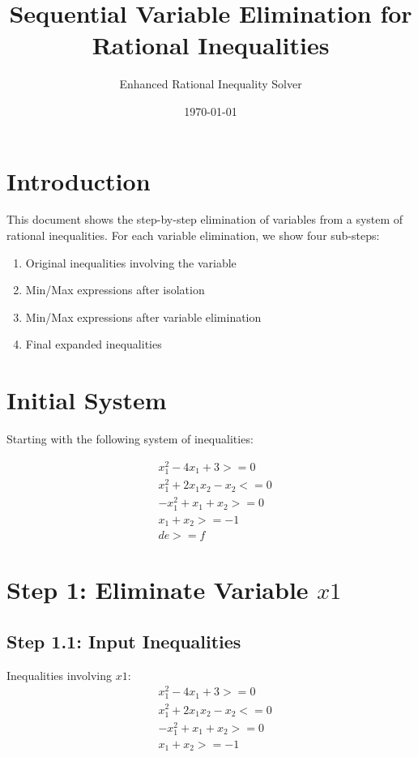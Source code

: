 \documentclass{article}
\title{Sequential Variable Elimination for Rational Inequalities}
\author{Enhanced Rational Inequality Solver}
\date{\today}
\begin{document}
\maketitle

\section{Introduction}

This document shows the step-by-step elimination of variables from a system of rational inequalities. 
For each variable elimination, we show four sub-steps:
\begin{enumerate}
\item Original inequalities involving the variable
\item Min/Max expressions after isolation
\item Min/Max expressions after variable elimination
\item Final expanded inequalities
\end{enumerate}

\section{Initial System}

Starting with the following system of inequalities:

\begin{align}
& x_{1}^{2} - 4 x_{1} + 3 >= 0 \\
& x_{1}^{2} + 2 x_{1} x_{2} - x_{2} <= 0 \\
& - x_{1}^{2} + x_{1} + x_{2} >= 0 \\
& x_{1} + x_{2} >= -1 \\
& d e >= f
\end{align}

\section{Step 1: Eliminate Variable $x1$}

\subsection{Step 1.1: Input Inequalities}

Inequalities involving $x1$:
\begin{align}
& x_{1}^{2} - 4 x_{1} + 3 >= 0 \\
& x_{1}^{2} + 2 x_{1} x_{2} - x_{2} <= 0 \\
& - x_{1}^{2} + x_{1} + x_{2} >= 0 \\
& x_{1} + x_{2} >= -1
\end{align}
\end{document}
